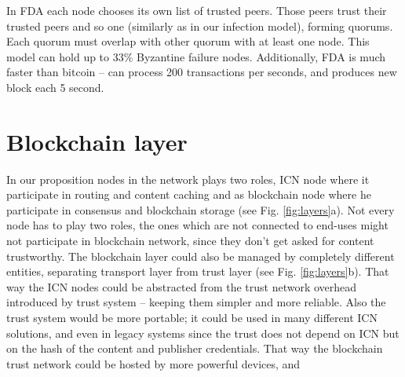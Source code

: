 \documentclass[nostrict]{szablonPG}
\begin{document}
In FDA each node chooses its own list of trusted peers. Those peers trust their trusted peers and so one (similarly as in our infection model), forming quorums. Each quorum must overlap with other quorum with at least one node. This model can hold up to 33\% Byzantine failure nodes. Additionally, FDA is much faster than bitcoin -- can process 200 transactions per seconds, and produces new block each 5 second. 


\section{Blockchain layer}
In our proposition nodes in the network plays two roles, ICN node where it participate in routing and content caching and as blockchain node where he participate in consensus and blockchain storage (see Fig. \ref{fig:layers}a). Not every node has to play two roles, the ones which are not connected to end-uses might not participate in blockchain network, since they don't get asked for content trustworthy. 
The blockchain layer could also be managed by completely different entities, separating transport layer from trust layer (see Fig. \ref{fig:layers}b). That way the ICN nodes could be abstracted from the trust network overhead introduced by trust system -- keeping them simpler and more reliable. Also the trust system would be more portable; it could be used in many different ICN solutions, and even in legacy systems since the trust does not depend on ICN but on the hash of the content and publisher credentials. That way the blockchain trust network could be hosted by more powerful devices, and 
\end{document}
